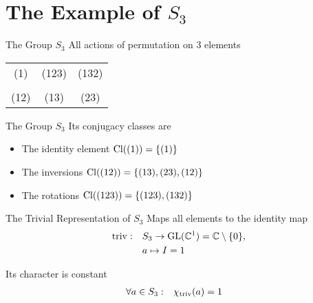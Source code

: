 
\section{The Example of $S_3$}

\begin{frame}{The Group $S_3$}
    \large
    All actions of permutation on $3$ elements

    \pause
    \vspace{2em}
    \centering
    \begin{tabular}{c c c}
        (1)  & (123) & (132) \\\\
        (12) & (13)  & (23)
    \end{tabular}
\end{frame}

\begin{frame}{The Group $S_3$}
    \large
    Its conjugacy classes are

    \pause
    \vspace{1em}
    \begin{itemize}
        \item The identity element \hspace*{\fill} $\operatorname{Cl}((1)) = \{(1)\}$ \pause
        \item The inversions \hspace*{\fill} $\operatorname{Cl}((12)) = \{(13), (23), (12)\}$ \pause
        \item The rotations \hspace*{\fill} $\operatorname{Cl}((123)) = \{(123), (132)\}$
    \end{itemize}
\end{frame}

\begin{frame}{The Trivial Representation of $S_3$}
    \large
    Maps all elements to the identity map
    \begin{align*}
        \operatorname{triv}: \quad & S_3 \to \operatorname{GL}(\mathbb{C}^1) = \mathbb{C} \setminus \{0\}, \\
        & a \mapsto I = 1
    \end{align*}

    \pause
    Its character is constant
    \begin{align*}
        \forall a \in S_3: \quad & \chi_{\operatorname{triv}}(a) = 1
    \end{align*}
\end{frame}


